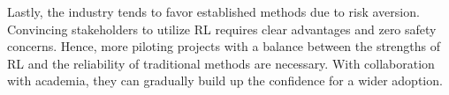 \documentclass[../main.tex]{subfiles}
\begin{document}
Lastly, the industry tends to favor established methods due to risk aversion. Convincing stakeholders to utilize RL requires clear advantages and zero safety concerns. Hence, more piloting projects with a balance between the strengths of RL and the reliability of traditional methods are necessary. With collaboration with academia, they can gradually build up the confidence for a wider adoption.
\end{document}
